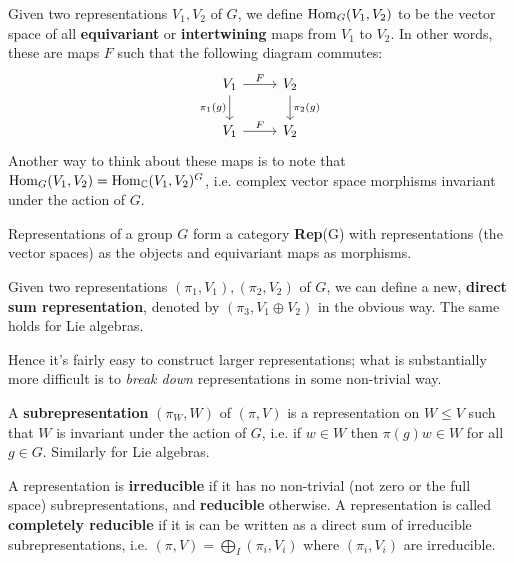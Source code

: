 \documentclass{../mathnotes}
\begin{document}
\begin{defn}
    Given two representations $V_1,V_2$ of $G$, we define $\operatorname{Hom}_G(V_1,V_2)$ to be the vector space of all \textbf{equivariant} or \textbf{intertwining} maps from $V_1$ to $V_2$.
    In other words, these are maps $F$ such that the following diagram commutes:
    \begin{equation*}
        \begin{tikzcd}
            V_1\arrow[swap]{d}{\pi_1(g)}\arrow{r}{F} & V_2\arrow{d}{\pi_2(g)}\\ 
            V_1\arrow{r}{F}&V_2
        \end{tikzcd}
    \end{equation*}
    Another way to think about these maps is to note that $\operatorname{Hom}_G(V_1,V_2)=\operatorname{Hom}_{\mathbb{C}}(V_1,V_2)^G$, i.e. complex vector space morphisms invariant under the action of $G$.
\end{defn}

\begin{rem}
    Representations of a group $G$ form a category \textbf{Rep}(G) with representations (the vector spaces) as the objects and equivariant maps as morphisms.
\end{rem}

\begin{defn}
    Given two representations $(\pi_1,V_1),(\pi_2,V_2)$ of $G$, we can define a new, \textbf{direct sum representation}, denoted by $(\pi_3,V_1\oplus V_2)$ in the obvious way.
    The same holds for Lie algebras.
\end{defn}

Hence it's fairly easy to construct larger representations; what is substantially more difficult is to \emph{break down} representations in some non-trivial way.

\begin{defn}
    A \textbf{subrepresentation} $(\pi_W,W)$ of $(\pi,V)$ is a representation on $W\leqslant V$ such that $W$ is invariant under the action of $G$, i.e.
    if $w\in W$ then $\pi(g)w\in W$ for all $g\in G$. Similarly for Lie algebras.
\end{defn}

\begin{defn}
    A representation is \textbf{irreducible} if it has no non-trivial (not zero or the full space) subrepresentations,
    and \textbf{reducible} otherwise. A representation is called \textbf{completely reducible} if it is can be written as a direct sum
    of irreducible subrepresentations, i.e.  $(\pi, V)=\bigoplus_I(\pi_i,V_i)$ where $(\pi_i,V_i)$ are irreducible.
\end{defn}
\end{document}
